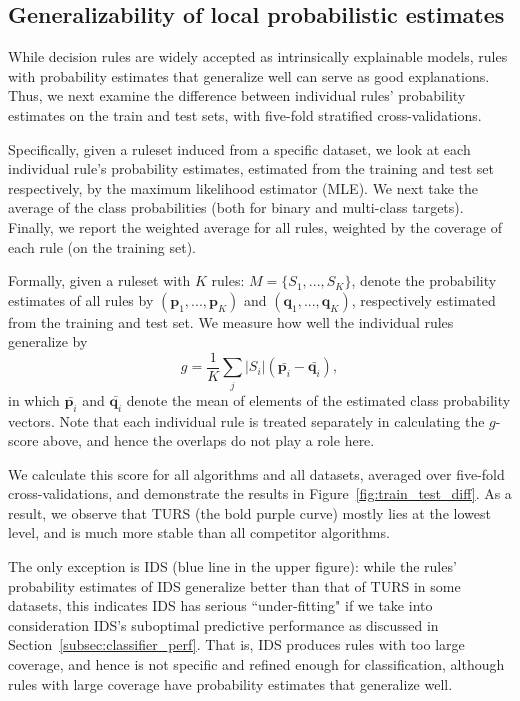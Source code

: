 \subsection{Generalizability of local probabilistic estimates}
While decision rules are widely accepted as intrinsically explainable models, rules with probability estimates that generalize well can serve as good explanations. Thus, we next examine the difference between individual rules' probability estimates on the train and test sets, with five-fold stratified cross-validations. 

Specifically, given a ruleset induced from a specific dataset, we look at each individual rule's probability estimates, estimated from the training and test set respectively, by the maximum likelihood estimator (MLE). We next take the average of the class probabilities (both for binary and multi-class targets). Finally, we report the weighted average for all rules, weighted by the coverage of each rule (on the training set). 

Formally, given a ruleset with $K$ rules: $M = \{S_1, ..., S_K\}$, denote the probability estimates of all rules by $(\mathbf{p}_1, ..., \mathbf{p}_K)$ and $(\mathbf{q}_1, ..., \mathbf{q}_K)$, respectively estimated from the training and test set. We measure how well the individual rules generalize by
\begin{equation} \label{eq:train_test_diff}
	g = \frac{1}{K}\sum_{j} |S_i| (\bar{\mathbf{p}_i} - \bar{\mathbf{q}_i}),
\end{equation}
in which $\bar{\mathbf{p}_i}$ and $\bar{\mathbf{q}_i}$ denote the mean of elements of the estimated class probability vectors. Note that each individual rule is treated separately in calculating the $g$-score above, and hence the overlaps do not play a role here. 

We calculate this score for all algorithms and all datasets, averaged over five-fold cross-validations, and demonstrate the results in Figure~\ref{fig:train_test_diff}. As a result, we observe that TURS (the bold purple curve) mostly lies at the lowest level, and is much more stable than all competitor algorithms. 

The only exception is IDS (blue line in the upper figure): while the rules' probability estimates of IDS generalize better than that of TURS in some datasets, this indicates IDS has serious ``under-fitting" if we take into consideration IDS's suboptimal predictive performance as discussed in Section~\ref{subsec:classifier_perf}. That is, IDS produces rules with too large coverage, and hence is not specific and refined enough for classification, although rules with large coverage have probability estimates that generalize well. 

